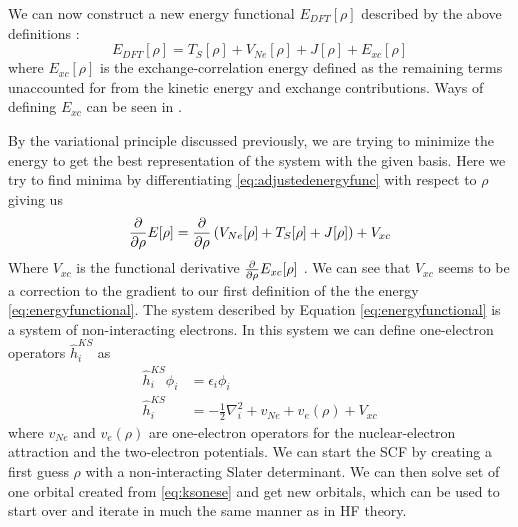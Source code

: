 \documentclass[../master_thesis.tex]{subfiles}
\begin{document}
We can now construct a new energy functional $E_{DFT}[\rho]$ described by the above
definitions \cite{Jensen:2017}:
\begin{equation}\label{eq:adjustedenergyfunc}
  E_{DFT}[\rho] = T_S[\rho] + V_{Ne}[\rho] + J[\rho] + E_{xc}[\rho]
\end{equation}
where $E_{xc}[\rho]$ is the exchange-correlation energy defined as the remaining terms
unaccounted for from the kinetic energy and exchange contributions. Ways of
defining $E_{xc}$ can be seen in \cite{Cramer:2004, Jensen:2017}.

By the variational principle discussed previously, we are trying to minimize the energy
to get the best representation of the system with the given basis. Here we try to
find minima by differentiating \ref{eq:adjustedenergyfunc} with respect to $\rho$ giving us
\begin{align}\label{eq:energyderiv}
   \frac{\partial}{\partial \rho}E[\rho] = \frac{\partial}{\partial \rho}\left( V_{Ne}[\rho] + T_S[\rho] + J[\rho]\right) + V_{xc}
\end{align}
Where $V_{xc}$ is the functional derivative $\frac{\partial}{\partial \rho}E_{xc}[\rho]$ \cite{Cramer:2004}.
We can see that $V_{xc}$ seems to be a correction to the gradient to our first definition
of the the energy \ref{eq:energyfunctional}. The system described by Equation
\ref{eq:energyfunctional} is a system of non-interacting electrons. In this
system we can define one-electron operators $\hat{h}_i^{KS}$ as
\begin{align}
  \hat{h}_i^{KS} \phi_i &= \epsilon_i \phi_i\label{eq:ksonese} \\
  \hat{h}_i^{KS} &= - \frac{1}{2}\nabla^2_i + v_{Ne} + v_e(\rho) + V_{xc}
\end{align}
where $v_{Ne}$ and $v_e(\rho)$ are one-electron operators for the nuclear-electron attraction and the
two-electron potentials.
We can start the \ac{SCF} by creating a first guess $\rho$ with a non-interacting Slater determinant.
We can then solve set of one orbital \SE created from \ref{eq:ksonese} and get new orbitals,
which can be used to start over and iterate in much the same manner as in \ac{HF} theory.


\biblio
\end{document}
